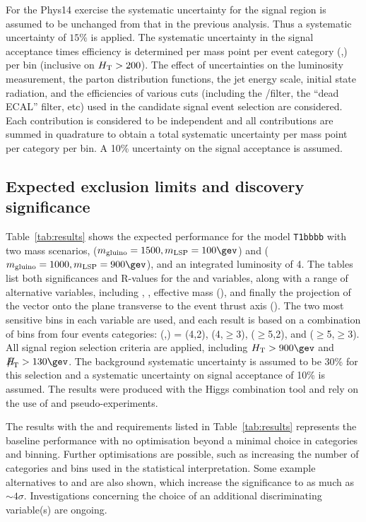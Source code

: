 For the Phys14 exercise the systematic uncertainty for the signal region 
is assumed to be unchanged from that in the previous analysis. 
Thus a systematic uncertainty of $15\%$ is applied. The systematic 
uncertainty in the signal acceptance times efficiency is determined per mass 
point per event category (\njet,\nb) per
\scalht bin (inclusive on $\scalht > 200$). The effect of
uncertainties on the luminosity measurement, the parton distribution
functions, the jet energy scale, initial state radiation, and the
efficiencies of various cuts (including the \mht/\met filter, the
``dead ECAL'' filter, etc)
used in the candidate signal event selection are considered. Each
contribution is considered to be independent and all contributions are
summed in quadrature to obtain a total systematic uncertainty per mass
point per category per \scalht bin. A 10\% uncertainty on the signal
acceptance is assumed. 


\subsection{Expected exclusion limits and discovery significance}
\label{subsec:susy_results}

Table~\ref{tab:results} shows
the expected performance for the model \verb!T1bbbb! with two mass
scenarios, ($m_{\rm gluino} = 1500,m_{\rm LSP} = 100\gev$) and
($m_{\rm gluino} = 1000,m_{\rm LSP} = 900\gev$), and an integrated
luminosity of 4\fbinv. The tables list both significances and R-values
for the \scalht and \alphat variables, along with a range of
alternative variables, including \mht, \met, effective mass (\meff),
and finally the projection of the \mht vector onto the plane
transverse to the event thrust axis (\mhttt). The two most sensitive
bins in each variable are used, and each result is based on a
combination of bins from four events categories: (\njet,\nb) = (4,2),
(4,$\geq$3), ($\geq$5,2), and ($\geq$5,$\geq$3). All signal region
selection criteria are applied, including $\scalht > 900\gev$ and
$\mht > 130\gev$. The background systematic uncertainty is assumed to
be 30\% for this selection and a systematic uncertainty on signal
acceptance of 10\% is assumed. The results were produced with the
Higgs combination tool and rely on the use of \cls and
pseudo-experiments.

The results with the \scalht and \alphat requirements listed in 
Table~\ref{tab:results} represents 
the baseline performance with no optimisation beyond a minimal choice
in categories and binning. Further optimisations are possible, such as
increasing the number of categories and bins used in the statistical
interpretation. Some example alternatives to \scalht and \alphat are
also shown, which increase the significance to as much as
$\sim4\sigma$. Investigations concerning the choice of an additional
discriminating variable(s) are ongoing.

